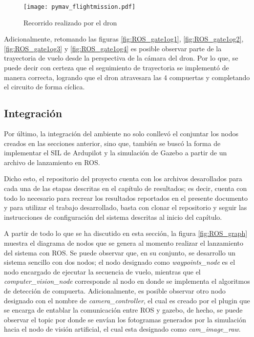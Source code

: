\begin{figure}[ht]
    \centering
    \texttt{[image: pymav\_flightmission.pdf]}
    \caption{Recorrido realizado por el dron}
    \label{fig:pymav_flightmission}
\end{figure}

Adicionalmente, retomando las figuras \ref{fig:ROS_gate1og1}, \ref{fig:ROS_gate1og2}, \ref{fig:ROS_gate1og3} y \ref{fig:ROS_gate1og4} es posible observar parte de la trayectoria de vuelo desde la perspectiva de la cámara del dron. Por lo que, se puede decir con certeza que el seguimiento de trayectoria se implementó de manera correcta, logrando que el dron atravesara las 4 compuertas y completando el circuito de forma cíclica.

\subsection{Integración}
Por último, la integración del ambiente no solo conllevó el conjuntar los nodos creados en las secciones anterior, sino que, también se buscó la forma de implementar el SIL de Ardupilot y la simulación de Gazebo a partir de un archivo de lanzamiento en ROS. 

Dicho esto, el repositorio del proyecto cuenta con los archivos desarollados para cada una de las etapas descritas en el capítulo de resultados; es decir, cuenta con todo lo necesario para recrear los resultados reportados en el presente documento y para utilizar el trabajo desarrollado, basta con clonar el repositorio y seguir las instrucciones de configuración del sistema descritas al inicio del capítulo.

A partir de todo lo que se ha discutido en esta sección, la figura \ref{fig:ROS_graph} muestra el diagrama de nodos que se genera al momento realizar el lanzamiento del sistema con ROS. Se puede observar que, en su conjunto, se desarrollo un sistema sencillo con dos nodos; el nodo designado como \textit{waypoints\_node} es el nodo encargado de ejecutar la secuencia de vuelo, mientras que el \textit{computer\_vision\_node} corresponde al nodo en donde se implementa el algoritmos de detección de compuerta. Adicionalmente, es posible observar otro nodo designado con el nombre de \textit{camera\_controller}, el cual es creado por el plugin que se encarga de entablar la comunicación entre ROS y gazebo, de hecho, se puede observar el topic por donde se envían los fotogramas generados por la simulación hacia el nodo de visión artificial, el cual esta designado como \textit{cam\_image\_raw}.

